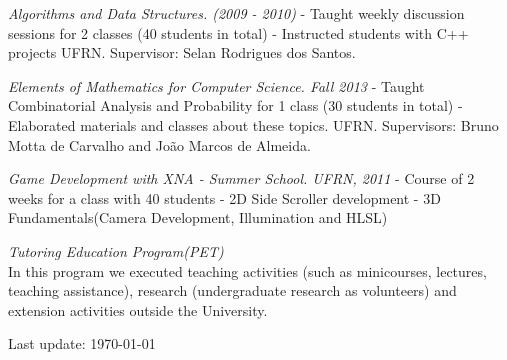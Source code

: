 \documentclass[letterpaper]{article}
\def\footerlink{}
\renewenvironment{itemize}{
  \begin{list}{}{
      \setlength{\leftmargin}{1.5em}
    }
  }{
  \end{list}
}
\begin{document}
\begin{itemize}

  
  \item[$\bullet$] \textit{Algorithms and Data Structures. (2009 - 2010)}
  - Taught weekly discussion sessions for 2 classes (40 students in total)
  - Instructed students with C++ projects
  UFRN. Supervisor: Selan Rodrigues dos Santos.\\
  
  \item[$\bullet$] \textit{Elements of Mathematics for Computer Science. Fall 2013}
  - Taught Combinatorial Analysis and Probability for 1 class (30 students in total)
  - Elaborated materials and classes about these topics.
  UFRN. Supervisors: Bruno Motta de Carvalho and Jo\~ao Marcos de Almeida. 
  
  \item[$\bullet$] \textit{Game Development with XNA - Summer School. UFRN, 2011}
  - Course of 2 weeks for a class with 40 students
  - 2D Side Scroller development
  - 3D Fundamentals(Camera Development, Illumination and HLSL)\\
  
  \item[$\bullet$] \textit{Tutoring Education Program(PET)}\\
  
  In this program we executed teaching activities (such as minicourses, lectures, teaching assistance), research (undergraduate research as volunteers) and extension activities outside the University. \\
 
\end{itemize}

\bigskip
\begin{center}
  \begin{footnotesize}
    Last update: \today \\
    \href{\footerlink}{\texttt{\footerlink}}
  \end{footnotesize}
\end{center}
\end{document}
